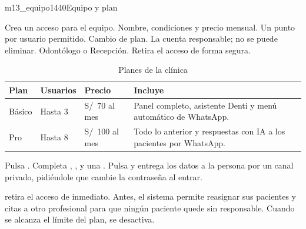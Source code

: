 \documentclass[11pt]{article}
\begin{document}
\begin{pantalla}{m13_equipo}{1440}{Equipo y plan}
\end{pantalla}

\begin{leyenda}
   Crea un acceso para el equipo.
   Nombre, condiciones y precio mensual.
   Un punto por usuario permitido.
   Cambio de plan.
   La cuenta responsable; no se puede eliminar.
   Odontólogo o Recepción.
   Retira el acceso de forma segura.
\end{leyenda}

\begin{table}[H]
\centering\small
\caption{Planes de la clínica}\label{tab:planes}
\begin{tabularx}{\linewidth}{@{}P{2.2cm}C{2.2cm}C{2.4cm}L@{}}
\toprule
\textbf{Plan} & \textbf{Usuarios} & \textbf{Precio} & \textbf{Incluye} \\
\midrule
Básico & Hasta 3 & S/~70 al mes & Panel completo, asistente Denti y menú automático de WhatsApp. \\
Pro & Hasta 8 & S/~100 al mes & Todo lo anterior y respuestas con IA a los pacientes por WhatsApp. \\
\bottomrule
\end{tabularx}
\end{table}

\begin{pasos}
  \paso Pulsa  .
  \paso Completa , ,  y una .
  \paso Pulsa  y entrega los datos a la persona por un canal privado, pidiéndole que cambie la contraseña al entrar.
\end{pasos}

\begin{sdpeligro}
  retira el acceso de inmediato. Antes, el sistema permite reasignar sus pacientes y citas a otro profesional para que ningún paciente quede sin responsable. Cuando se alcanza el límite del plan,  se desactiva.
\end{sdpeligro}
\end{document}
